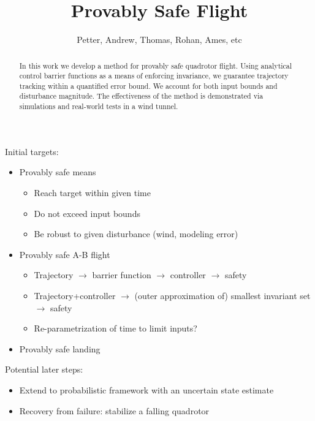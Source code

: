 \documentclass[conference]{IEEEtran}
\begin{document}
\title{\huge Provably Safe Flight }

\author{Petter, Andrew, Thomas, Rohan, Ames, etc}

\maketitle

\begin{abstract}
In this work we develop a method for provably safe quadrotor flight. Using analytical control barrier functions as a means of enforcing invariance, we guarantee trajectory tracking within a quantified error bound. We account for both input bounds and disturbance magnitude. The effectiveness of the method is demonstrated via simulations and real-world tests in a wind tunnel. 
\end{abstract}


\IEEEpeerreviewmaketitle

	

Initial targets:

\begin{itemize}
  \item Provably safe means
  \begin{itemize}
    \item Reach target within given time
    \item Do not exceed input bounds
    \item Be robust to given disturbance (wind, modeling error)
  \end{itemize}
  \item Provably safe A-B flight
  \begin{itemize}
    \item Trajectory $\rightarrow$ barrier function $\rightarrow$ controller $\rightarrow$ safety
    \item Trajectory+controller $\rightarrow$ (outer approximation of) smallest invariant set $\rightarrow$ safety
    \item Re-parametrization of time to limit inputs?
  \end{itemize}
  \item Provably safe landing
\end{itemize}

Potential later steps:
\begin{itemize}
  \item Extend to probabilistic framework with an uncertain state estimate
  \item Recovery from failure: stabilize a falling quadrotor
\end{itemize}
\end{document}
